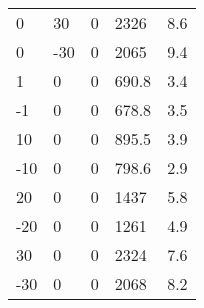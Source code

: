 \begin{table}
\begin{tabular}{lllll}
  0    &     30     &     0      &      2326    &    8.6\\
  0    &     -30    &     0      &      2065    &    9.4\\
  1    &     0      &     0      &      690.8   &    3.4\\
  -1   &     0      &     0      &      678.8   &    3.5\\
  10   &     0      &     0      &      895.5   &    3.9\\
  -10  &     0      &     0      &      798.6   &    2.9\\
  20   &     0      &     0      &      1437    &    5.8\\
  -20  &     0      &     0      &      1261    &    4.9\\
  30   &     0      &     0      &      2324    &    7.6\\
  -30   &    0      &     0      &      2068   &     8.2\\
  \bottomrule
\end{tabular}
\label{tab:lit1}
\end{table}
